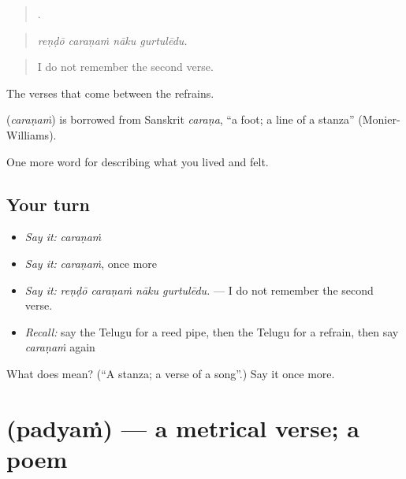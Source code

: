 \begin{quote}
   .
\end{quote}

\begin{quote}
\emph{reṇḍō caraṇaṁ nāku gurtulēdu.}
\end{quote}

\begin{quote}
I do not remember the second verse.
\end{quote}

The verses that come between the refrains.

\begin{cousinweb}
\textbf{} (\emph{caraṇaṁ}) is borrowed from Sanskrit \emph{caraṇa}, \textquotedblleft{}a foot; a line of a stanza\textquotedblright{} (Monier-Williams).
\end{cousinweb}

\begin{grammarlens}[title={What you've built}]
One more word for describing what you lived and felt.
\end{grammarlens}

\subsection*{Your turn}
\begin{itemize}
\raggedright
  \item \emph{Say it:} \emph{caraṇaṁ}
  \item \emph{Say it:} \emph{caraṇaṁ}, once more
  \item \emph{Say it:} \emph{reṇḍō caraṇaṁ nāku gurtulēdu.} — I do not remember the second verse.
  \item \emph{Recall:} say the Telugu for a reed pipe, then the Telugu for a refrain, then say \emph{caraṇaṁ} again
\end{itemize}

\begin{tcolorbox}[breakable,colback=teal!4,colframe=teal!35!black,title={Before you move on}]
What does  mean? (\textquotedblleft{}A stanza; a verse of a song\textquotedblright{}.) Say it once more.
\end{tcolorbox}
\section[\texorpdfstring{\te{పద్యం} (padyaṁ)}{పద్యం (padyaṁ)}]{ (padyaṁ) — a metrical verse; a poem}

